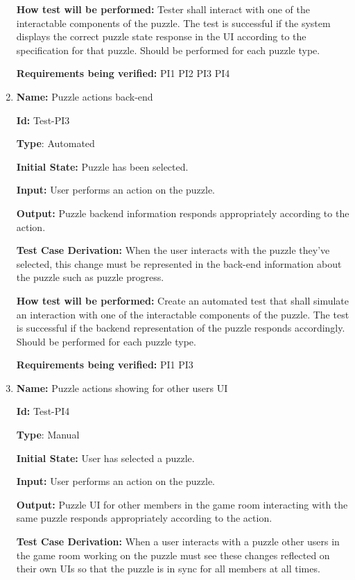 \documentclass[12pt, titlepage]{article}
\begin{document}
\begin{enumerate}
\textbf{How test will be performed:}
Tester shall interact with one of the interactable components of the puzzle. The test is successful if the system displays the correct puzzle state response in the UI according to the specification for that puzzle. Should be performed for each puzzle type.

\textbf{Requirements being verified: } PI1 PI2 PI3 PI4

\item{\textbf{Name:} Puzzle actions back-end} \label{itm:Test-PI3}

\textbf{Id:} Test-PI3

\textbf{Type}: Automated

\textbf{Initial State:} Puzzle has been selected.

\textbf{Input:} User performs an action on the puzzle.

\textbf{Output:} Puzzle backend information responds appropriately according to the action.

\textbf{Test Case Derivation:}
When the user interacts with the puzzle they've selected, this change must be represented in the back-end information about the puzzle such as puzzle progress.

\textbf{How test will be performed:}
Create an automated test that shall simulate an interaction with one of the interactable components of the puzzle. The test is successful if the backend representation of the puzzle responds accordingly. Should be performed for each puzzle type.

\textbf{Requirements being verified: } PI1 PI3

\item{\textbf{Name:} Puzzle actions showing for other users UI} \label{itm:Test-PI4}

\textbf{Id:} Test-PI4

\textbf{Type}: Manual

\textbf{Initial State:} User has selected a puzzle.

\textbf{Input:} User performs an action on the puzzle.

\textbf{Output:} Puzzle UI for other members in the game room interacting with the same puzzle responds appropriately according to the action.

\textbf{Test Case Derivation:}
When a user interacts with a puzzle other users in the game room working on the puzzle must see these changes reflected on their own UIs so that the puzzle is in sync for all members at all times.


\end{enumerate}
\end{document}
